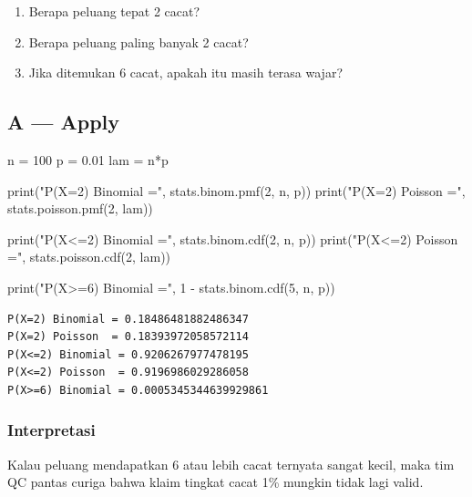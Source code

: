 \documentclass[
  letterpaper,
  DIV=11,
  numbers=noendperiod]{scrreprt}
\newenvironment{Shaded}{\begin{snugshade}}{\end{snugshade}}
\newcommand{\BuiltInTok}[1]{\textcolor[rgb]{0.00,0.23,0.31}{#1}}
\newcommand{\DecValTok}[1]{\textcolor[rgb]{0.68,0.00,0.00}{#1}}
\newcommand{\FloatTok}[1]{\textcolor[rgb]{0.68,0.00,0.00}{#1}}
\newcommand{\NormalTok}[1]{\textcolor[rgb]{0.00,0.23,0.31}{#1}}
\newcommand{\OperatorTok}[1]{\textcolor[rgb]{0.37,0.37,0.37}{#1}}
\newcommand{\StringTok}[1]{\textcolor[rgb]{0.13,0.47,0.30}{#1}}
\providecommand{\tightlist}{%
  \setlength{\itemsep}{0pt}\setlength{\parskip}{0pt}}
\begin{document}
\begin{enumerate}
\def\labelenumi{\arabic{enumi}.}
\tightlist
\item
  Berapa peluang tepat 2 cacat?
\item
  Berapa peluang paling banyak 2 cacat?
\item
  Jika ditemukan 6 cacat, apakah itu masih terasa wajar?
\end{enumerate}

\subsection{A --- Apply}\label{a-apply-16}

\begin{Shaded}
\begin{Highlighting}[]
\NormalTok{n }\OperatorTok{=} \DecValTok{100}
\NormalTok{p }\OperatorTok{=} \FloatTok{0.01}
\NormalTok{lam }\OperatorTok{=}\NormalTok{ n}\OperatorTok{*}\NormalTok{p}

\BuiltInTok{print}\NormalTok{(}\StringTok{"P(X=2) Binomial ="}\NormalTok{, stats.binom.pmf(}\DecValTok{2}\NormalTok{, n, p))}
\BuiltInTok{print}\NormalTok{(}\StringTok{"P(X=2) Poisson  ="}\NormalTok{, stats.poisson.pmf(}\DecValTok{2}\NormalTok{, lam))}

\BuiltInTok{print}\NormalTok{(}\StringTok{"P(X\textless{}=2) Binomial ="}\NormalTok{, stats.binom.cdf(}\DecValTok{2}\NormalTok{, n, p))}
\BuiltInTok{print}\NormalTok{(}\StringTok{"P(X\textless{}=2) Poisson  ="}\NormalTok{, stats.poisson.cdf(}\DecValTok{2}\NormalTok{, lam))}

\BuiltInTok{print}\NormalTok{(}\StringTok{"P(X\textgreater{}=6) Binomial ="}\NormalTok{, }\DecValTok{1} \OperatorTok{{-}}\NormalTok{ stats.binom.cdf(}\DecValTok{5}\NormalTok{, n, p))}
\end{Highlighting}
\end{Shaded}

\begin{verbatim}
P(X=2) Binomial = 0.18486481882486347
P(X=2) Poisson  = 0.18393972058572114
P(X<=2) Binomial = 0.9206267977478195
P(X<=2) Poisson  = 0.9196986029286058
P(X>=6) Binomial = 0.0005345344639929861
\end{verbatim}

\subsubsection{Interpretasi}\label{interpretasi-8}

Kalau peluang mendapatkan 6 atau lebih cacat ternyata sangat kecil, maka
tim QC pantas curiga bahwa klaim tingkat cacat 1\% mungkin tidak lagi
valid.
\end{document}
